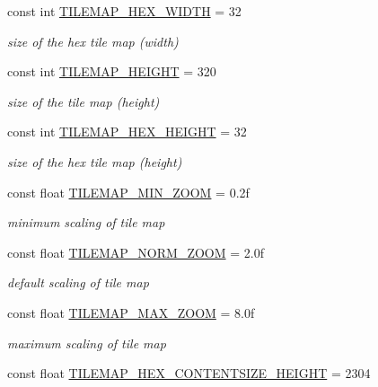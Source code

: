 \begin{DoxyCompactItemize}
const int \hyperlink{classClient_1_1Common_1_1Constants_1_1ClientConstants_a27089e6b9689c3f4f0866051e3515a85}{T\+I\+L\+E\+M\+A\+P\+\_\+\+H\+E\+X\+\_\+\+W\+I\+D\+T\+H} = 32
\begin{DoxyCompactList}\small\item\em size of the hex tile map (width) \end{DoxyCompactList}\item 
const int \hyperlink{classClient_1_1Common_1_1Constants_1_1ClientConstants_a460e9b4c7c5be4b860cd3b0e85e7e604}{T\+I\+L\+E\+M\+A\+P\+\_\+\+H\+E\+I\+G\+H\+T} = 320
\begin{DoxyCompactList}\small\item\em size of the tile map (height) \end{DoxyCompactList}\item 
const int \hyperlink{classClient_1_1Common_1_1Constants_1_1ClientConstants_aaf5b62017af7f14b0f431f2a0cdd6e84}{T\+I\+L\+E\+M\+A\+P\+\_\+\+H\+E\+X\+\_\+\+H\+E\+I\+G\+H\+T} = 32
\begin{DoxyCompactList}\small\item\em size of the hex tile map (height) \end{DoxyCompactList}\item 
const float \hyperlink{classClient_1_1Common_1_1Constants_1_1ClientConstants_af7862f0c822d4869bab497fbe0ecad6c}{T\+I\+L\+E\+M\+A\+P\+\_\+\+M\+I\+N\+\_\+\+Z\+O\+O\+M} = 0.\+2f
\begin{DoxyCompactList}\small\item\em minimum scaling of tile map \end{DoxyCompactList}\item 
const float \hyperlink{classClient_1_1Common_1_1Constants_1_1ClientConstants_a15c5a5cf12e8150acc1adc85b3c57a6a}{T\+I\+L\+E\+M\+A\+P\+\_\+\+N\+O\+R\+M\+\_\+\+Z\+O\+O\+M} = 2.\+0f
\begin{DoxyCompactList}\small\item\em default scaling of tile map \end{DoxyCompactList}\item 
const float \hyperlink{classClient_1_1Common_1_1Constants_1_1ClientConstants_a06fd333e38965052bc3b4b7163d1b6dd}{T\+I\+L\+E\+M\+A\+P\+\_\+\+M\+A\+X\+\_\+\+Z\+O\+O\+M} = 8.\+0f
\begin{DoxyCompactList}\small\item\em maximum scaling of tile map \end{DoxyCompactList}\item 
const float \hyperlink{classClient_1_1Common_1_1Constants_1_1ClientConstants_a3fbb35a1779b087e1883cb6902ff6232}{T\+I\+L\+E\+M\+A\+P\+\_\+\+H\+E\+X\+\_\+\+C\+O\+N\+T\+E\+N\+T\+S\+I\+Z\+E\+\_\+\+H\+E\+I\+G\+H\+T} = 2304

\end{DoxyCompactItemize}
